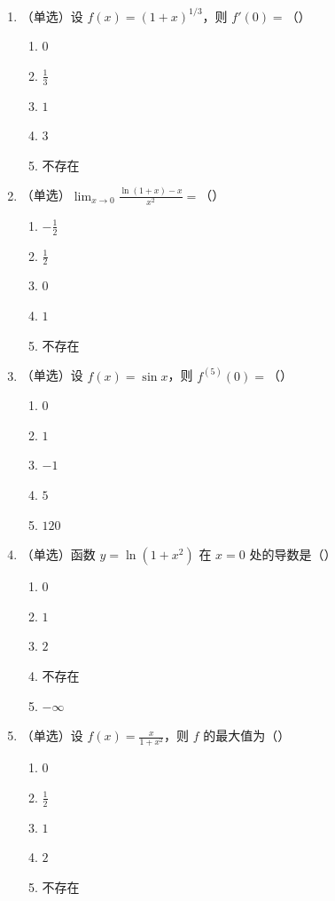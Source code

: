 \begin{enumerate}[label=\textbf{B\arabic*.}]
  \item （单选）设 $f(x)=(1+x)^{1/3}$，则 $f'(0)=$（\quad）
    \begin{enumerate}[label=(\Alph*),nosep]
    \item $0$ \item $\frac13$ \item $1$ \item $3$ \item 不存在
    \end{enumerate}
  \item （单选）$\displaystyle\lim_{x\to0}\frac{\ln(1+x)-x}{x^{2}}=$（\quad）
    \begin{enumerate}[label=(\Alph*),nosep]
    \item $-\frac12$ \item $\frac12$ \item $0$ \item $1$ \item 不存在
    \end{enumerate}
  \item （单选）设 $f(x)=\sin x$，则 $f^{(5)}(0)=$（\quad）
    \begin{enumerate}[label=(\Alph*),nosep]
    \item $0$ \item $1$ \item $-1$ \item $5$ \item $120$
    \end{enumerate}
  \item （单选）函数 $y=\ln(1+x^{2})$ 在 $x=0$ 处的导数是（\quad）
    \begin{enumerate}[label=(\Alph*),nosep]
    \item $0$ \item $1$ \item $2$ \item 不存在 \item $-\infty$
    \end{enumerate}
  \item （单选）设 $f(x)=\frac{x}{1+x^{2}}$，则 $f$ 的最大值为（\quad）
    \begin{enumerate}[label=(\Alph*),nosep]
    \item $0$ \item $\frac12$ \item $1$ \item $2$ \item 不存在
    \end{enumerate}

\end{enumerate}
